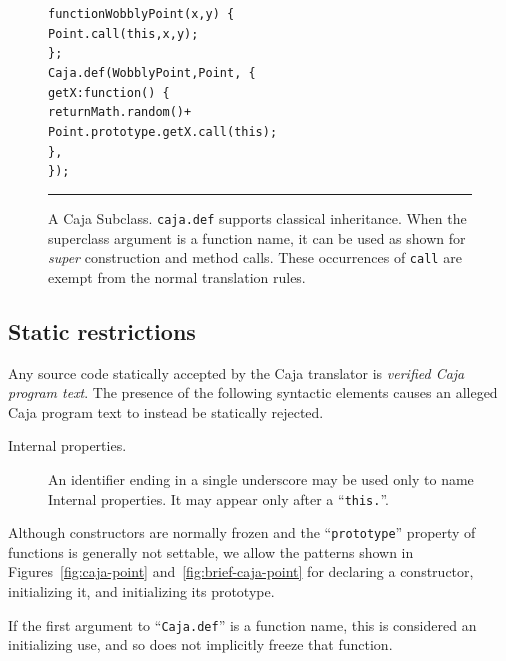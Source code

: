 \documentclass[letterpaper,twocolumn,10pt]{article}
\newcommand{\code}[1]{{\tt {#1}}}              %
\begin{document}
\begin{figure}[t!]
\begin{alltt}
function WobblyPoint(x, y)\ \{
  Point.call(this, x, y);
\};
Caja.def(WobblyPoint, Point,\ \{
  getX: function()\ \{ 
    return Math.random() +
      Point.prototype.getX.call(this); 
  \},
\});
\end{alltt}

\caption[A Caja Subclass.]{A Caja Subclass. \code{caja.def} supports 
classical inheritance. When the superclass argument is a function name, it 
can be used as shown for \emph{super} construction and method calls. These 
occurrences of \code{call} are exempt from the normal translation rules. 
\\ } \hrule
\label{fig:caja-subclass}
\end{figure}


\subsection{Static restrictions}

Any source code statically accepted by the Caja translator is \emph{verified 
Caja program text}. The presence of the following syntactic elements causes 
an alleged Caja program text to instead be statically rejected.

\begin{description}

    \item[Internal properties.] An identifier ending in a single underscore 
    may be used only to name Internal properties. It may appear only after a 
    ``\code{this.}''.

\end{description}

Although constructors are normally frozen and the ``\code{prototype}'' 
property of functions is generally not settable, we allow the 
patterns shown in Figures~\ref{fig:caja-point} and~\ref{fig:brief-caja-point} 
for declaring a constructor, initializing it, and initializing its prototype.

If the first argument to ``\code{Caja.def}'' is a function name, this is 
considered an initializing use, and so does not implicitly freeze that 
function. 
\end{document}

